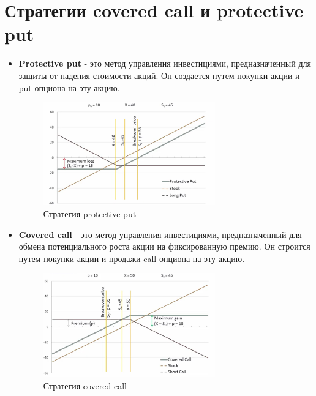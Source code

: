 \documentclass{article}
\begin{document}
 \section{Стратегии covered call и protective put}
 \begin{itemize}
     \item \textbf{Protective put} - это метод управления инвестициями, предназначенный для защиты от падения стоимости акций. Он создается путем покупки акции и put опциона на эту акцию.
     \begin{figure}[h]
    \centering
    \includegraphics[width=0.7\textwidth]{protective put.png}
    \caption{Стратегия protective put}
    \label{Стратегия protective put}
    \end{figure}

     \item \textbf{Covered call} - это метод управления инвестициями, предназначенный для обмена потенциального роста акции на фиксированную премию. Он строится путем покупки акции и продажи call опциона на эту акцию.
     
     \begin{figure}[h]
     \centering
    \includegraphics[width=0.7\textwidth]{covered call.png}
    \caption{Стратегия covered call}
    \label{Стратегия covered call}
    \end{figure}
     
 \end{itemize}
 
\end{document}
